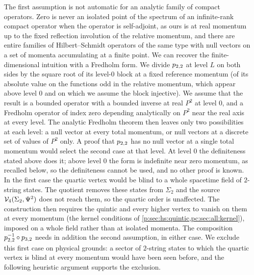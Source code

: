 The first assumption is not automatic for an analytic family of compact operators.
  Zero is never an isolated point of the spectrum of an infinite-rank compact operator when the operator is self-adjoint, as ours is at real momentum up to the fixed reflection involution of the relative momentum, and there are entire families of Hilbert--Schmidt operators of the same type with null vectors on a set of momenta accumulating at a finite point.
  We can recover the finite-dimensional intuition with a Fredholm form.
  We divide $p_{2,2}$ at level $L$ on both sides by the square root of its level-$0$ block at a fixed reference momentum (of its absolute value on the functions odd in the relative momentum, which appear above level $0$ and on which we assume the block injective).
  We assume that the result is a bounded operator with a bounded inverse at real $P^2$ at level $0$, and a Fredholm operator of index zero depending analytically on $P^2$ near the real axis at every level.
  The analytic Fredholm theorem then leaves only two possibilities at each level: a null vector at every total momentum, or null vectors at a discrete set of values of $P^2$ only.
A proof that $p_{2,2}$ has no null vector at a single total momentum would select the second case at that level.
  At level $0$ the definiteness stated above does it; above level $0$ the form is indefinite near zero momentum, as recalled below, so the definiteness cannot be used, and no other proof is known.
  In the first case the quartic vertex would be blind to a whole spacetime field of $2$-string states.
  The quotient removes these states from $\Sigma_2$ and the source $\mathcal{V}_{4}(\Sigma_2, \Psi^2)$ does not reach them, so the quartic order is unaffected.
  The construction then requires the quintic and every higher vertex to vanish on them at every momentum (the kernel conditions of \cref{p:sec:hs:quintic,pc:sec:all:kernel}), imposed on a whole field rather than at isolated momenta.
  The composition $p_{2,2}^{-1} \circ p_{3,2}$ needs in addition the second assumption, in either case.
  We exclude this first case on physical grounds: a sector of $2$-string states to which the quartic vertex is blind at every momentum would have been seen before, and the following heuristic argument supports the exclusion.

